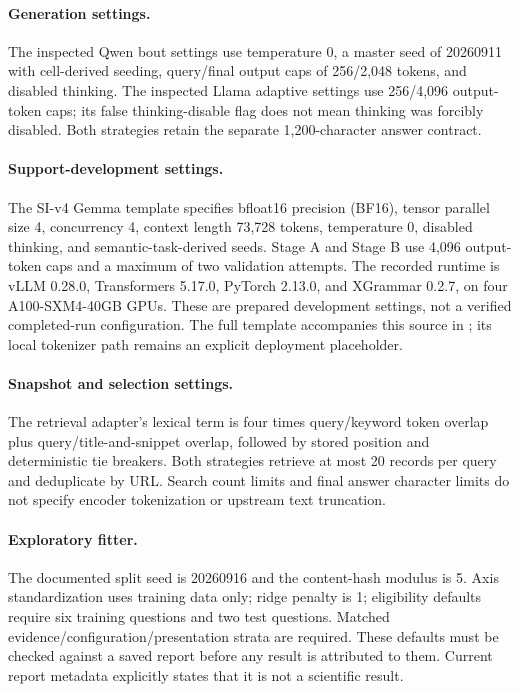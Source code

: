 \paragraph{Generation settings.}
The inspected Qwen bout settings use temperature 0, a master seed of 20260911 with cell-derived seeding, query/final output caps of 256/2,048 tokens, and disabled thinking. The inspected Llama adaptive settings use 256/4,096 output-token caps; its false thinking-disable flag does not mean thinking was forcibly disabled. Both strategies retain the separate 1,200-character answer contract. 

\paragraph{Support-development settings.}
The SI-v4 Gemma template specifies bfloat16 precision (BF16), tensor parallel size 4, concurrency 4, context length 73,728 tokens, temperature 0, disabled thinking, and semantic-task-derived seeds. Stage A and Stage B use 4,096 output-token caps and a maximum of two validation attempts. The recorded runtime is vLLM 0.28.0, Transformers 5.17.0, PyTorch 2.13.0, and XGrammar 0.2.7, on four A100-SXM4-40GB GPUs. These are prepared development settings, not a verified completed-run configuration. The full template accompanies this source in ; its local tokenizer path remains an explicit deployment placeholder.

\paragraph{Snapshot and selection settings.}
The retrieval adapter's lexical term is four times query/keyword token overlap plus query/title-and-snippet overlap, followed by stored position and deterministic tie breakers. Both strategies retrieve at most 20 records per query and deduplicate by URL.  Search count limits and final answer character limits do not specify encoder tokenization or upstream text truncation.

\paragraph{Exploratory fitter.}
The documented split seed is 20260916 and the content-hash modulus is 5. Axis standardization uses training data only; ridge penalty is 1; eligibility defaults require six training questions and two test questions. Matched evidence/configuration/presentation strata are required. These defaults must be checked against a saved report before any result is attributed to them. Current report metadata explicitly states that it is not a scientific result.

